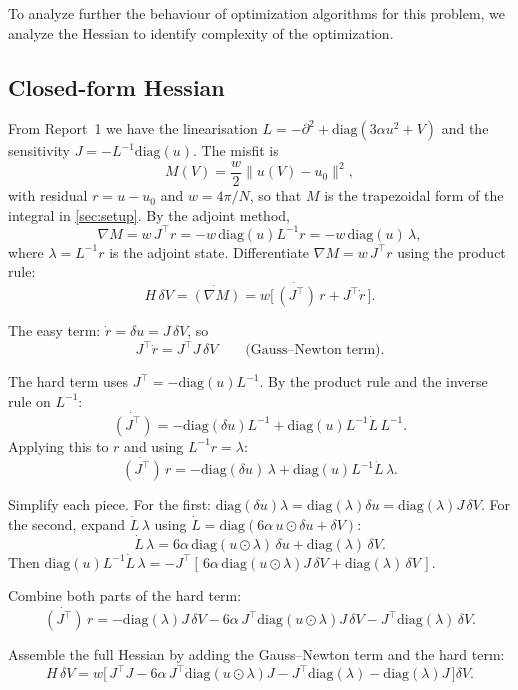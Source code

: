 \documentclass[11pt,a4paper]{article}
\begin{document}
To analyze further the behaviour of optimization algorithms for this problem, we analyze the Hessian to  identify complexity of the optimization.
\subsection{Closed-form Hessian}\label{subsec:hessian}
From Report~1 we have the linearisation $L = -\partial^2 + \mathrm{diag}(3\alpha u^2 + V)$
and the sensitivity $J = -L^{-1}\mathrm{diag}(u)$. The misfit is
\[
M(V) = \frac{w}{2}\|u(V) - u_0\|^2,
\]
with residual $r = u - u_0$ and $w = 4\pi/N$, so that $M$ is the trapezoidal form of the integral in \cref{sec:setup}. By the adjoint method,
\[
\nabla M = w\,J^\top r = -w\,\mathrm{diag}(u)L^{-1}r = -w\,\mathrm{diag}(u)\,\lambda,
\]
where $\lambda = L^{-1}r$ is the adjoint state.
Differentiate $\nabla M = w\,J^\top r$ using the product rule:
\[
H\,\delta V = \dot{(\nabla M)} = w\big[\,\dot{(J^\top)}\,r + J^\top\dot r\,\big].
\]

The easy term: $\dot r = \delta u = J\,\delta V$, so
\[
J^\top\dot r = J^\top J\,\delta V \qquad\text{(Gauss--Newton term)}.
\]

The hard term uses $J^\top = -\mathrm{diag}(u)L^{-1}$. By the product rule and the inverse rule on $L^{-1}$:
\[
\dot{(J^\top)} = -\mathrm{diag}(\delta u)L^{-1} + \mathrm{diag}(u)L^{-1}\dot L\,L^{-1}.
\]
Applying this to $r$ and using $L^{-1}r = \lambda$:
\[
\dot{(J^\top)}\,r = -\mathrm{diag}(\delta u)\,\lambda + \mathrm{diag}(u)L^{-1}\dot L\,\lambda.
\]

Simplify each piece. For the first: $\mathrm{diag}(\delta u)\lambda = \mathrm{diag}(\lambda)\delta u = \mathrm{diag}(\lambda)J\,\delta V$.
For the second, expand $\dot L\,\lambda$ using $\dot L = \mathrm{diag}(6\alpha\,u\odot\delta u + \delta V)$:
\[
\dot L\,\lambda = 6\alpha\,\mathrm{diag}(u\odot\lambda)\,\delta u + \mathrm{diag}(\lambda)\,\delta V.
\]
Then $\mathrm{diag}(u)L^{-1}\dot L\,\lambda = -J^\top[\,6\alpha\,\mathrm{diag}(u\odot\lambda)J\,\delta V + \mathrm{diag}(\lambda)\,\delta V\,]$.

Combine both parts of the hard term:
\[
\dot{(J^\top)}\,r = -\mathrm{diag}(\lambda)J\,\delta V - 6\alpha\,J^\top\mathrm{diag}(u\odot\lambda)J\,\delta V - J^\top\mathrm{diag}(\lambda)\,\delta V.
\]

Assemble the full Hessian by adding the Gauss--Newton term and the hard term:
\[
H\,\delta V = w\big[\,J^\top J - 6\alpha\,J^\top\mathrm{diag}(u\odot\lambda)J - J^\top\mathrm{diag}(\lambda) - \mathrm{diag}(\lambda)J\,\big]\delta V.
\]
\end{document}
